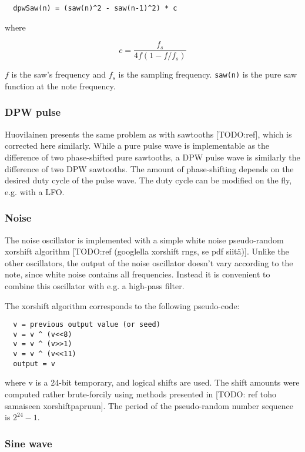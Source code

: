 \documentclass[10pt,a4paper,oneside]{article}
\begin{document}
\begin{verbatim}
  dpwSaw(n) = (saw(n)^2 - saw(n-1)^2) * c
\end{verbatim}

where

\[
  c = \frac{f_s}{4 f (1 - f/f_s)}
\]

$f$ is the saw's frequency and $f_s$ is the sampling frequency. \verb|saw(n)| is the pure saw function at the note frequency.

\subsubsection{DPW pulse}

Huovilainen presents the same problem as with sawtooths [TODO:ref], which is corrected here similarly. While a pure pulse wave is implementable as the difference of two phase-shifted pure sawtooths, a DPW pulse wave is similarly the difference of two DPW sawtooths. The amount of phase-shifting depends on the desired duty cycle of the pulse wave. The duty cycle can be modified on the fly, e.g. with a LFO.

\subsubsection{Noise}

The noise oscillator is implemented with a simple white noise pseudo-random xorshift algorithm [TODO:ref (googlella xorshift rngs, se pdf siitä)]. Unlike the other oscillators, the output of the noise oscillator doesn't vary according to the note, since white noise contains all frequencies. Instead it is convenient to combine this oscillator with e.g. a high-pass filter.

The xorshift algorithm corresponds to the following pseudo-code:

\begin{verbatim}
  v = previous output value (or seed)
  v = v ^ (v<<8)
  v = v ^ (v>>1)
  v = v ^ (v<<11)
  output = v
\end{verbatim}

where v is a 24-bit temporary, and logical shifts are used. The shift amounts were computed rather brute-forcily using methods presented in [TODO: ref toho samaiseen xorshiftpapruun]. The period of the pseudo-random number sequence is $2^{24} - 1$.

\subsubsection{Sine wave}
\end{document}
